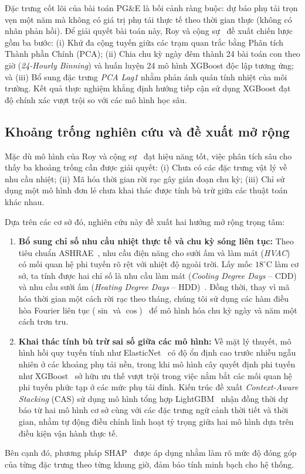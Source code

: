 Đặc trưng cốt lõi của bài toán PG\&E là bối cảnh ràng buộc: dự báo phụ tải trọn vẹn một năm mà không có giá trị phụ tải thực tế theo thời gian thực (không có nhãn phản hồi). Để giải quyết bài toán này, Roy và cộng sự~\cite{roy2025hourly} đề xuất chiến lược gồm ba bước: (i) Khử đa cộng tuyến giữa các trạm quan trắc bằng Phân tích Thành phần Chính (PCA); (ii) Chia chu kỳ ngày đêm thành 24 bài toán con theo giờ (\textit{24-Hourly Binning}) và huấn luyện 24 mô hình XGBoost độc lập tương ứng; và (iii) Bổ sung đặc trưng \textit{PCA Lag1} nhằm phản ánh quán tính nhiệt của môi trường. Kết quả thực nghiệm khẳng định hướng tiếp cận sử dụng XGBoost đạt độ chính xác vượt trội so với các mô hình học sâu.

\subsection{Khoảng trống nghiên cứu và đề xuất mở rộng}
Mặc dù mô hình của Roy và cộng sự~\cite{roy2025hourly} đạt hiệu năng tốt, việc phân tích sâu cho thấy ba khoảng trống cần được giải quyết: (i) Chưa có các đặc trưng vật lý về nhu cầu nhiệt; (ii) Mã hóa thời gian rời rạc gây gián đoạn chu kỳ; (iii) Chỉ sử dụng một mô hình đơn lẻ chưa khai thác được tính bù trừ giữa các thuật toán khác nhau.

Dựa trên các cơ sở đó, nghiên cứu này đề xuất hai hướng mở rộng trọng tâm:
\begin{enumerate}
    \item \textbf{Bổ sung chỉ số nhu cầu nhiệt thực tế và chu kỳ sóng liên tục:} Theo tiêu chuẩn ASHRAE~\cite{ashrae2021fundamentals}, nhu cầu điện năng cho sưởi ấm và làm mát (\textit{HVAC}) có mối quan hệ phi tuyến rõ rệt với nhiệt độ ngoài trời. Lấy mốc $18^\circ\text{C}$ làm cơ sở, ta tính được hai chỉ số là nhu cầu làm mát (\textit{Cooling Degree Days} -- CDD) và nhu cầu sưởi ấm (\textit{Heating Degree Days} -- HDD)~\cite{quayle1980heating}. Đồng thời, thay vì mã hóa thời gian một cách rời rạc theo tháng, chúng tôi sử dụng các hàm điều hòa Fourier liên tục ($\sin$ và $\cos$)~\cite{cleveland1990stl, hyndman2018forecasting} để mô hình hóa chu kỳ ngày và năm một cách trơn tru.
    \item \textbf{Khai thác tính bù trừ sai số giữa các mô hình:} Về mặt lý thuyết, mô hình hồi quy tuyến tính như ElasticNet~\cite{zou2005regularization} có độ ổn định cao trước nhiễu ngẫu nhiên ở các khoảng phụ tải nền, trong khi mô hình cây quyết định phi tuyến như XGBoost~\cite{chen2016xgboost} sở hữu ưu thế vượt trội trong việc nắm bắt các mối quan hệ phi tuyến phức tạp ở các mức phụ tải đỉnh. Kiến trúc đề xuất \textit{Context-Aware Stacking} (CAS) sử dụng mô hình tổng hợp LightGBM~\cite{ke2017lightgbm} nhận đồng thời dự báo từ hai mô hình cơ sở cùng với các đặc trưng ngữ cảnh thời tiết và thời gian, nhằm tự động điều chỉnh linh hoạt tỷ trọng giữa hai mô hình dựa trên điều kiện vận hành thực tế.
\end{enumerate}

Bên cạnh đó, phương pháp SHAP~\cite{lundberg2017shap} được áp dụng nhằm làm rõ mức độ đóng góp của từng đặc trưng theo từng khung giờ, đảm bảo tính minh bạch cho hệ thống.